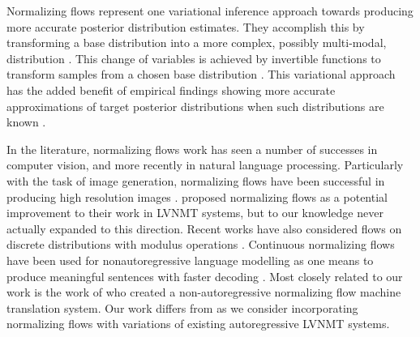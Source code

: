 Normalizing flows represent one variational inference approach towards producing more accurate posterior distribution estimates. They accomplish this by transforming a base distribution into a more complex, possibly multi-modal, distribution \cite{tabak2010densityestimationdual,tabak2013familyofnonparametricdensity}. This change of variables is achieved by invertible functions to transform samples from a chosen base distribution \cite{rezende2015VIwithNF}. This variational approach has the added benefit of empirical findings showing more accurate approximations of target posterior distributions when such distributions are known \cite{rezende2015VIwithNF}.

In the literature, normalizing flows work has seen a number of successes in computer vision, and more recently in natural language processing. Particularly with the task of image generation, normalizing flows have been successful in producing high resolution images \cite{ kingma2016IAF, tomczak2016Householder,kingma2018GLOW, Berg2018SylvesterNF}. \citet{schulz2018StochasticDecoder} proposed normalizing flows as a potential improvement to their work in \ac{LVNMT} systems, but to our knowledge never actually expanded to this direction. Recent works have also considered flows on discrete distributions with modulus operations \cite{hoogeboom2019IntegerDiscreteFlows, tran2019discreteflows}. Continuous normalizing flows have been used for nonautoregressive language modelling as one means to produce meaningful sentences with faster decoding \cite{ziegler2019LatentNFforDiscrete}. Most closely related to our work is the work of \citet{flowseq2019Xuezhe} who created a  non-autoregressive normalizing flow machine translation system.  Our work differs from \citet{flowseq2019Xuezhe} as we consider incorporating normalizing flows with variations of existing autoregressive \ac{LVNMT} systems. 




